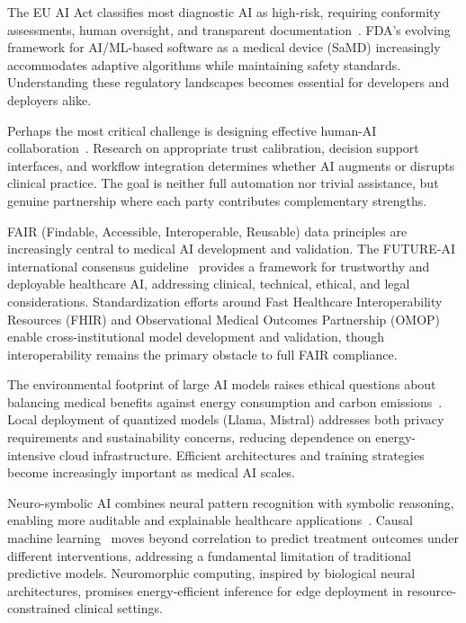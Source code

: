 \documentclass[krantz2,ChapterTOCs]{krantz}
\begin{document}
\begin{description}[style=nextline, leftmargin=1em, labelindent=0pt, itemsep=0.2ex]
\item[Regulatory evolution]
The EU AI Act classifies most diagnostic AI as high-risk, requiring conformity assessments, human oversight, and transparent documentation~\citep{aboy2024euaiact}.
FDA's evolving framework for AI/ML-based software as a medical device (SaMD) increasingly accommodates adaptive algorithms while maintaining safety standards.
Understanding these regulatory landscapes becomes essential for developers and deployers alike.

\item[The human-AI interface]
Perhaps the most critical challenge is designing effective human-AI collaboration~\citep{tun2025aitrust}.
Research on appropriate trust calibration, decision support interfaces, and workflow integration determines whether AI augments or disrupts clinical practice.
The goal is neither full automation nor trivial assistance, but genuine partnership where each party contributes complementary strengths.

\item[Data sharing and interoperability]
FAIR (Findable, Accessible, Interoperable, Reusable) data principles are increasingly central to medical AI development and validation.
The FUTURE-AI international consensus guideline~\citep{lekadir2025futureai} provides a framework for trustworthy and deployable healthcare AI, addressing clinical, technical, ethical, and legal considerations.
Standardization efforts around Fast Healthcare Interoperability Resources (FHIR) and Observational Medical Outcomes Partnership (OMOP) enable cross-institutional model development and validation, though interoperability remains the primary obstacle to full FAIR compliance.

\item[Sustainable and local AI]
The environmental footprint of large AI models raises ethical questions about balancing medical benefits against energy consumption and carbon emissions~\citep{schmitz2026sustainableai}.
Local deployment of quantized models (Llama, Mistral) addresses both privacy requirements and sustainability concerns, reducing dependence on energy-intensive cloud infrastructure.
Efficient architectures and training strategies become increasingly important as medical AI scales.

\item[Emerging computational paradigms]
Neuro-symbolic AI combines neural pattern recognition with symbolic reasoning, enabling more auditable and explainable healthcare applications~\citep{prenosil2025neurosymbolic,bhuyan2024neurosymbolic}.
Causal machine learning~\citep{feuerriegel2024causal} moves beyond correlation to predict treatment outcomes under different interventions, addressing a fundamental limitation of traditional predictive models.
Neuromorphic computing, inspired by biological neural architectures, promises energy-efficient inference for edge deployment in resource-constrained clinical settings.


\end{description}
\end{document}
